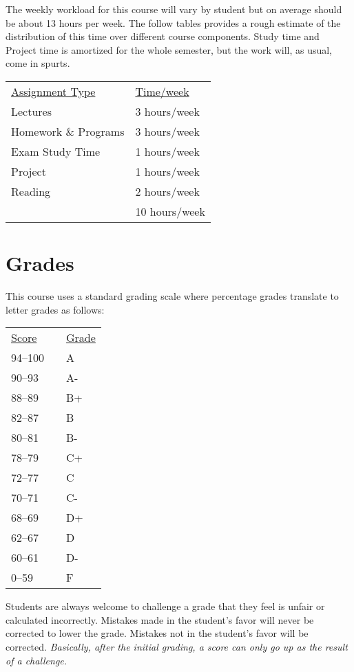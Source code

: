 \documentclass[10pt]{article}
\begin{document}
 The weekly workload for this course will vary by student but on average should be about 13 hours per week.  The follow tables provides a rough estimate of the distribution of this time over different course components. Study time and Project time is amortized for the whole semester, but the work will, as usual, come in spurts.
 \begin{center}
 \begin{tabular}{ll}
 \underline{Assignment Type} & \underline{Time/week} \\
 Lectures       & 3 hours/week \\
 Homework \& Programs & 3 hours/week \\
 Exam Study Time    & 1 hours/week \\
 Project          & 1 hours/week \\
 Reading &  2 hours/week \\
 \bottomrule
  & 10 hours/week
 \end{tabular}
 \end{center}


\section{Grades}

This course uses a standard grading scale where percentage grades translate to letter grades as follows:

\begin{center}
\begin{small}
\begin{tabular}{lcl}
\underline{Score} & & \underline{Grade} \\
94--100 & & A \\
90--93 & & A- \\
88--89 & & B+ \\
82--87 & & B \\
80--81 & & B- \\
78--79 & & C+ \\
72--77 & & C \\
70--71 & & C- \\
68--69 & & D+ \\
62--67 & & D \\
60--61 & & D- \\
0--59 & & F
\end{tabular}
\end{small}
\end{center}

Students are always welcome to challenge a grade that they feel is unfair or calculated incorrectly.  Mistakes made in the student's favor will never be corrected to lower the grade.  Mistakes not in the student's favor will be corrected.  \textit{Basically, after the initial grading, a score can only go up as the result of a challenge.}
\end{document}
